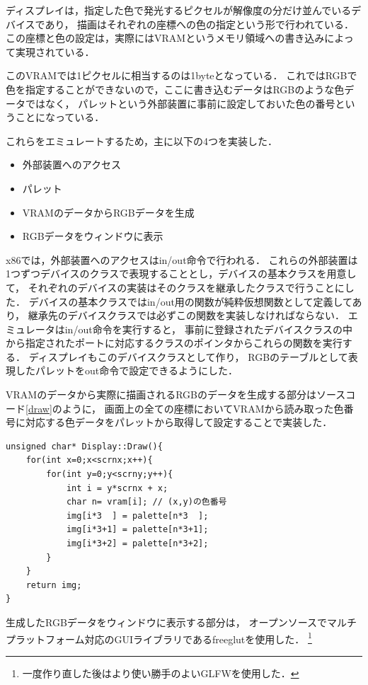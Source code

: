 \documentclass[10pt,a4j]{jsarticle}
\begin{document}
ディスプレイは，指定した色で発光するピクセルが解像度の分だけ並んでいるデバイスであり，
描画はそれぞれの座標への色の指定という形で行われている．
この座標と色の設定は，実際にはVRAMというメモリ領域への書き込みによって実現されている．

このVRAMでは1ピクセルに相当するのは1byteとなっている．
これではRGBで色を指定することができないので，ここに書き込むデータはRGBのような色データではなく，
パレットという外部装置に事前に設定しておいた色の番号ということになっている．

これらをエミュレートするため，主に以下の4つを実装した．
\begin{itemize}
	\item 外部装置へのアクセス
	\item パレット
	\item VRAMのデータからRGBデータを生成
	\item RGBデータをウィンドウに表示
\end{itemize}

x86では，外部装置へのアクセスはin/out命令で行われる．
これらの外部装置は1つずつデバイスのクラスで表現することとし，デバイスの基本クラスを用意して，
それぞれのデバイスの実装はそのクラスを継承したクラスで行うことにした．
デバイスの基本クラスではin/out用の関数が純粋仮想関数として定義してあり，
継承先のデバイスクラスでは必ずこの関数を実装しなければならない．
エミュレータはin/out命令を実行すると，
事前に登録されたデバイスクラスの中から指定されたポートに対応するクラスのポインタからこれらの関数を実行する．
ディスプレイもこのデバイスクラスとして作り，
RGBのテーブルとして表現したパレットをout命令で設定できるようにした．

VRAMのデータから実際に描画されるRGBのデータを生成する部分はソースコード\ref{draw}のように，
画面上の全ての座標においてVRAMから読み取った色番号に対応する色データをパレットから取得して設定することで実装した．
\vspace{-2mm}
\begin{lstlisting}[label=draw,caption=パレットのデータを使って描画データを生成]
unsigned char* Display::Draw(){
	for(int x=0;x<scrnx;x++){
		for(int y=0;y<scrny;y++){
			int i = y*scrnx + x;
			char n= vram[i]; // (x,y)の色番号
			img[i*3  ] = palette[n*3  ];
			img[i*3+1] = palette[n*3+1];
			img[i*3+2] = palette[n*3+2];
		}
	}
	return img;
}
\end{lstlisting}

生成したRGBデータをウィンドウに表示する部分は，
オープンソースでマルチプラットフォーム対応のGUIライブラリであるfreeglutを使用した．
\footnote{一度作り直した後はより使い勝手のよいGLFWを使用した．}
\end{document}
